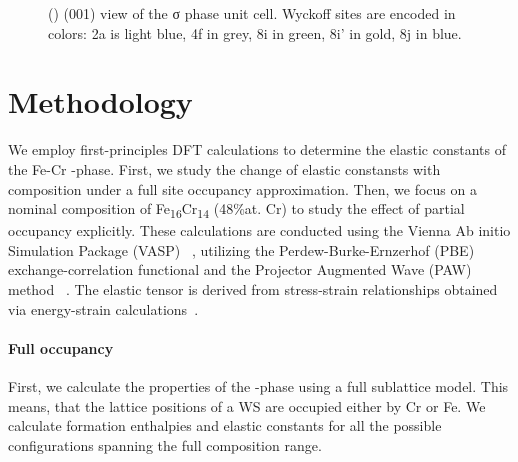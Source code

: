 \documentclass[superscriptaddress, 12pt]{revtex4-2}%
\begin{document}
\begin{figure}
  \caption{\protect\label{fig:introduction}
    () (001) view of the σ phase unit cell.
    Wyckoff sites are encoded in colors: 2a is light blue,
    4f in grey, 8i in green, 8i' in gold, 8j in blue.
  }
\end{figure}

\section{Methodology}

We employ first-principles DFT calculations to determine the elastic constants of the Fe-Cr \textsigma-phase. 
First, we study the change of elastic constansts with composition under a full site occupancy approximation.
Then, we focus on a nominal composition of Fe\textsubscript{16}Cr\textsubscript{14} (48\%at. Cr) to study the effect of partial occupancy explicitly.
These calculations are conducted using the Vienna Ab initio Simulation Package (VASP) ~\cite{Hafner_vasp}, utilizing the Perdew-Burke-Ernzerhof (PBE) ~\cite{Perdew1996} exchange-correlation functional and the Projector Augmented Wave (PAW) method ~\cite{Bloch1994, kresse_ultrasoft_1999}.
The elastic tensor is derived from stress-strain relationships obtained via energy-strain calculations~\cite{golesorkhtabar_elastic_2013}.

\paragraph{Full occupancy}

First, we calculate the properties of the \textsigma-phase using a full sublattice model.
This means, that the lattice positions of a WS are occupied either by Cr or Fe.
We calculate formation enthalpies and elastic constants for all the possible configurations spanning the full composition range.
\end{document}
